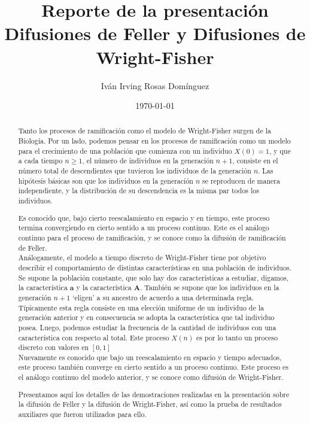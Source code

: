 \documentclass[letterpaper]{article}
\title{\textbf{Reporte de la presentación}\\
Difusiones de Feller y Difusiones de Wright-Fisher}
\author{Iván Irving Rosas Domínguez}
\date{\today}
\newcommand{\1}{\mathds{1}}
\theoremstyle{definition}
\theoremstyle{definition}
\theoremstyle{definition}
\theoremstyle{definition}
\theoremstyle{definition}
\begin{document}
\maketitle

\begin{abstract}
    Tanto los procesos de ramificación como el modelo de Wright-Fisher surgen de la Biología. Por un lado, 
    podemos pensar en los procesos de ramificación como un modelo para el crecimiento de una población que 
    comienza con un individuo $X(0)=1$, y que a cada tiempo $n\geq1$, el número de individuos en la generación 
    $n+1$, consiste en el número total de descendientes que tuvieron los individuos de la generación $n$. 
    Las hipótesis básicas son que los individuos en la generación $n$ se reproducen de manera independiente, y 
    la distribución de su descendencia es la misma par todos los individuos. 
    \newline
    
    Es conocido que, bajo cierto reescalamiento en espacio y en tiempo, este proceso termina convergiendo 
    en cierto sentido a un proceso continuo. Este es el análogo continuo para el proceso de ramificación, y se conoce como 
    la difusión de ramificación de Feller.\\
    
    Análogamente, el modelo a tiempo discreto de Wright-Fisher tiene por objetivo describir el comportamiento 
    de distintas características en una población de individuos. Se supone la población constante, que solo hay 
    dos características a estudiar, digamos, la característica $\textbf{a}$ y la característica $\textbf{A}$. También se supone 
    que los individuos en la generación $n+1$ `eligen' a su ancestro de acuerdo a una determinada regla. Típicamente 
    esta regla consiste en una elección uniforme de un individuo de la generación anterior y en consecuencia 
    se adopta la característica que tal individuo posea. Luego, podemos estudiar la frecuencia de 
    la cantidad de individuos con una característica con respecto al total. Este proceso $X(n)$ es por lo tanto 
    un proceso discreto con valores en $[0,1]$\\

    Nuevamente es conocido que bajo un reescalamiento en espacio y tiempo adecuados, este proceso 
    también converge en cierto sentido a un proceso continuo. Este proceso es el análogo continuo del modelo 
    anterior, y se conoce como difusión de Wright-Fisher.

    Presentamos aquí los detalles de las demostraciones realizadas en la presentación sobre 
    la difusión de Feller y la difusión de Wright-Fisher, así como la prueba de resultados auxiliares que 
    fueron utilizados para ello.
\end{abstract}
\end{document}
